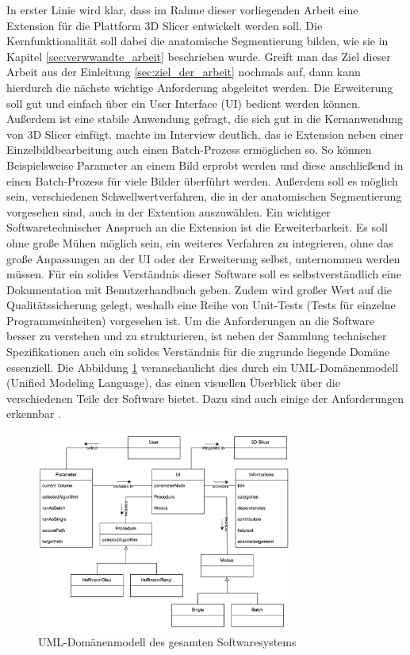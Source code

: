In erster Linie wird klar, dass im Rahme dieser vorliegenden Arbeit eine Extension
für die Plattform 3D Slicer entwickelt werden soll. Die Kernfunktionalität soll
dabei die anatomische Segmentierung bilden, wie sie in Kapitel \ref{sec:verwwandte_arbeit}
beschrieben wurde. Greift man das Ziel dieser Arbeit aus der Einleitung
\ref{sec:ziel_der_arbeit} nochmals auf, dann kann hierdurch die nächste wichtige
Anforderung abgeleitet werden. Die Erweiterung soll gut und einfach über ein
User Interface (UI) bedient werden können. Außerdem ist eine stabile Anwendung gefragt,
die sich gut in die Kernanwendung von 3D Slicer einfügt. \citet[]{walter2025}
machte im Interview deutlich, das ie Extension neben einer Einzelbildbearbeitung
auch einen Batch-Prozess ermöglichen so. So können Beispielsweise Parameter an
einem Bild erprobt werden und diese anschließend in einen Batch-Prozess für
viele Bilder überführt werden. Außerdem soll es möglich sein, verschiedenen
Schwellwertverfahren, die in der anatomischen Segmentierung vorgesehen sind,
auch in der Extention auszuwählen. Ein wichtiger Softwaretechnischer Anspruch an
die Extension ist die Erweiterbarkeit. Es soll ohne große Mühen möglich sein, ein
weiteres Verfahren zu integrieren, ohne das große Anpassungen an der UI oder der
Erweiterung selbst, unternommen werden müssen. Für ein solides Verständnis
dieser Software soll es selbstverständlich eine Dokumentation mit
Benutzerhandbuch geben. Zudem wird großer Wert auf die Qualitätssicherung gelegt,
weshalb eine Reihe von Unit-Tests (Tests für einzelne Programmeinheiten)
vorgesehen ist. Um die Anforderungen an die Software besser zu verstehen und zu strukturieren,
ist neben der Sammlung technischer Spezifikationen auch ein solides Verständnis
für die zugrunde liegende Domäne essenziell. Die Abbildung \ref{fig:3d_slicer_domäne}
veranschaulicht dies durch ein UML-Domänenmodell (Unified Modeling Language),
das einen visuellen Überblick über die verschiedenen Teile der Software bietet. Dazu
sind auch einige der Anforderungen erkennbar \citep[vgl.][]{walter2025}.

\begin{figure}[h]
	\centering
	\includegraphics[width=0.75\textwidth]{img/domaenenmodell.jpg}
	\caption{UML-Domänenmodell des gesamten Softwaresystems}
	\label{fig:3d_slicer_domäne}
\end{figure}

